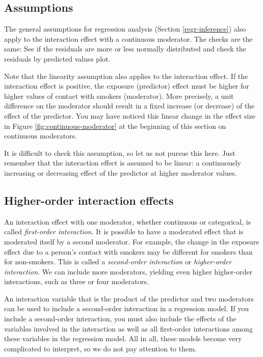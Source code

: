 \documentclass[a4paper]{book}
\theoremstyle{definition}
\theoremstyle{definition}
\theoremstyle{definition}
\theoremstyle{remark}
\begin{document}
\subsection{Assumptions}\label{assumptions}

The general assumptions for regression analysis (Section
\ref{regr-inference}) also apply to the interaction effect with a
continuous moderator. The checks are the same: See if the residuals are
more or less normally distributed and check the residuals by predicted
values plot.

Note that the linearity assumption also applies to the interaction
effect. If the interaction effect is positive, the exposure (predictor)
effect must be higher for higher values of contact with smokers
(moderator). More precisely, a unit difference on the moderator should
result in a fixed increase (or decrease) of the effect of the predictor.
You may have noticed this linear change in the effect size in Figure
\ref{fig:continuous-moderator} at the beginning of this section on
continuous moderators.

It is difficult to check this assumption, so let us not pursue this
here. Just remember that the interaction effect is assumed to be linear:
a continuously increasing or decreasing effect of the predictor at
higher moderator values.

\subsection{Higher-order interaction
effects}\label{higher-order-interaction-effects}

An interaction effect with one moderator, whether continuous or
categorical, is called \emph{first-order interaction}. It is possible to
have a moderated effect that is moderated itself by a second moderator.
For example, the change in the exposure effect due to a person's contact
with smokers may be different for smokers than for non-smokers. This is
called a \emph{second-order interaction} or \emph{higher-order
interaction}. We can include more moderators, yielding even higher
higher-order interactions, such as three or four moderators.

An interaction variable that is the product of the predictor and two
moderators can be used to include a second-order interaction in a
regression model. If you include a second-order interaction, you must
also include the effects of the variables involved in the interaction as
well as all first-order interactions among these variables in the
regression model. All in all, these models become very complicated to
interpret, so we do not pay attention to them.
\end{document}
